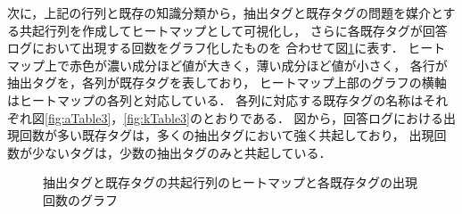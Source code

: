 次に，上記の行列と既存の知識分類から，抽出タグと既存タグの問題を媒介とする共起行列を作成してヒートマップとして可視化し，
さらに各既存タグが回答ログにおいて出現する回数をグラフ化したものを
合わせて図\ref{fig:Heatmap}に表す．
ヒートマップ上で赤色が濃い成分ほど値が大きく，薄い成分ほど値が小さく，
各行が抽出タグを，各列が既存タグを表しており，
ヒートマップ上部のグラフの横軸はヒートマップの各列と対応している．
各列に対応する既存タグの名称はそれぞれ図\ref{fig:aTable3}，\ref{fig:kTable3}のとおりである．
図から，回答ログにおける出現回数が多い既存タグは，多くの抽出タグにおいて強く共起しており，
出現回数が少ないタグは，少数の抽出タグのみと共起している．

\begin{figure}[H]
\begin{center}
\hspace*{-20pt}
\end{center}
\caption{抽出タグと既存タグの共起行列のヒートマップと各既存タグの出現回数のグラフ}
\label{fig:Heatmap}
\end{figure}


